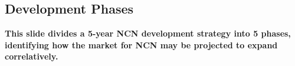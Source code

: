 
\begin{frame}{}
\section{Development Phases}


\vspace{-.8em}

{\hspace{1.5em}\begin{minipage}[l]{.9\textwidth}\Large\centering\color{slidePartHeadColor} 	
{\LARGE \textbf{This slide divides a 5-year NCN development 
strategy into 5 phases, identifying how the market for 
NCN may be projected to expand correlatively.}}
\vspace{1.4em}	
\end{minipage}}	



\end{frame}
